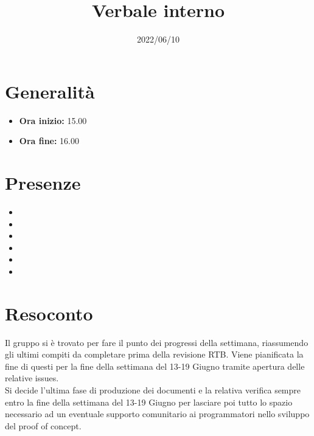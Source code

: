 \documentclass{classes/base}
\title{Verbale interno}
\date{2022/06/10}
\author{\marcob}
\renewcommand{\maketitle}{
    
}
\begin{document}
    \maketitle

    \section*{Generalità}
    \begin{itemize}
        \item \textbf{Ora inizio:} 15.00
        \item \textbf{Ora fine:} 16.00
    \end{itemize}

    \section*{Presenze}
    \begin{itemize}
    	\item \angela
        \item \marcob
        \item \tommaso
        \item \matteo
        \item \marcov
        \item \giulio
    \end{itemize}

    \section*{Resoconto}
    Il gruppo si è trovato per fare il punto dei progressi della settimana, riassumendo 
    gli ultimi compiti da completare prima della revisione RTB. Viene pianificata la fine 
    di questi per la fine della settimana del 13-19 Giugno tramite apertura delle relative issues.\\ 
    Si decide l’ultima fase di produzione dei documenti e la relativa verifica sempre entro la fine 
    della settimana del 13-19 Giugno per lasciare poi tutto lo spazio necessario ad un eventuale 
    supporto comunitario ai programmatori nello sviluppo del proof of concept.
\end{document}
